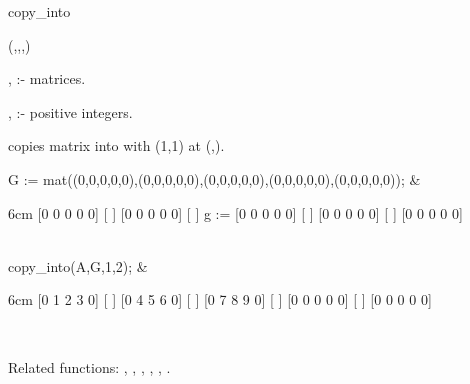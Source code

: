 \begin{Operator}{copy_into}

\begin{Syntax}
(,,,)
\end{Syntax}

, :- matrices. 

, :- positive integers. 


 copies matrix  into  with 
(1,1) at (,).

\begin{Examples} 

G := mat((0,0,0,0,0),(0,0,0,0,0),(0,0,0,0,0),(0,0,0,0,0),(0,0,0,0,0)); &
\begin{multilineoutput}{6cm}
     [0  0  0  0  0]
     [             ]
     [0  0  0  0  0]
     [             ]
g := [0  0  0  0  0]
     [             ]
     [0  0  0  0  0]
     [             ]
     [0  0  0  0  0]
\end{multilineoutput} \\

copy_into(A,G,1,2); &
\begin{multilineoutput}{6cm}
[0  1  2  3  0]
[             ]
[0  4  5  6  0]
[             ]
[0  7  8  9  0]
[             ]
[0  0  0  0  0]
[             ]
[0  0  0  0  0]
\end{multilineoutput} \\

\end{Examples}

Related functions: 
, , , 
, , .

\end{Operator}


